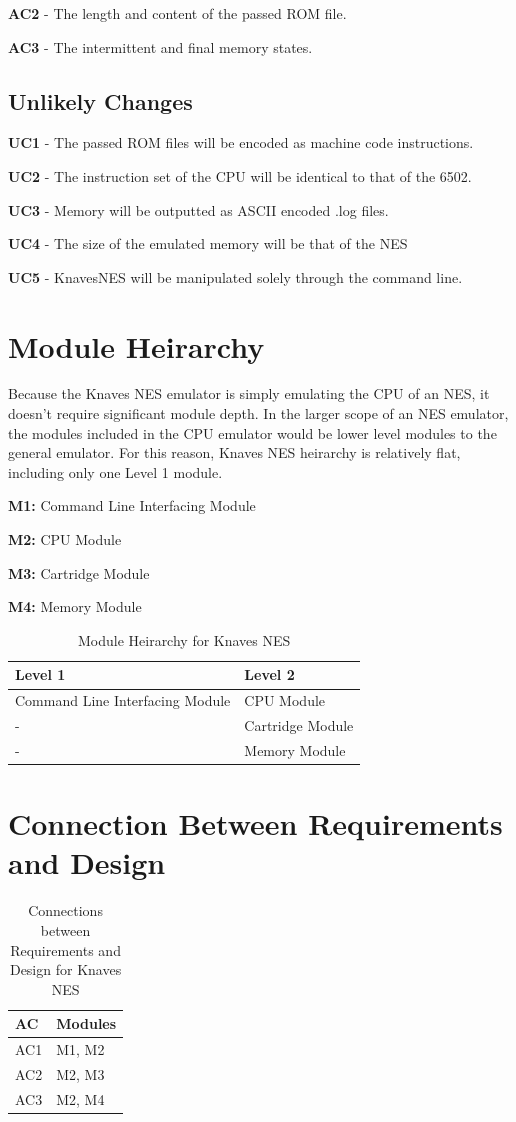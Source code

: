 \documentclass[12pt]{article}
\begin{document}
		\textbf{AC2} - The length and content of the passed ROM file.

		\textbf{AC3} - The intermittent and final memory states.

	\subsection{Unlikely Changes}
		\textbf{UC1} - The passed ROM files will be encoded as machine code instructions.

		\textbf{UC2} - The instruction set of the CPU will be identical to that of the 6502.

		\textbf{UC3} - Memory will be outputted as ASCII encoded .log files.

		\textbf{UC4} - The size of the emulated memory will be that of the NES

		\textbf{UC5} - KnavesNES will be manipulated solely through the command line.

\section{Module Heirarchy}
	Because the Knaves NES emulator is simply emulating the CPU of an NES, it doesn't require significant module depth. In the larger scope of an NES emulator, the modules included in the CPU emulator would be lower level modules to the general emulator. For this reason, Knaves NES heirarchy is relatively flat, including only one Level 1 module.

		\textbf{M1: } Command Line Interfacing Module

		\textbf{M2: } CPU Module

		\textbf{M3: } Cartridge Module

		\textbf{M4: } Memory Module

	\begin{table}[H]
		\centering
		\begin{tabular}{p{2in} p{2in}}
			\hline
			Level 1 & Level 2\\
			\hline
			Command Line Interfacing Module & CPU Module\\
			- & Cartridge Module\\
			- & Memory Module \\
		\end{tabular}
		\caption{Module Heirarchy for Knaves NES}
	\end{table}	

\section{Connection Between Requirements and Design}
	\begin{table}[H]
		\centering
		\begin{tabular}{p{2in} p{2in}}
			\hline
			\textbf{AC} & \textbf{Modules} \\
			\hline
			AC1 & M1, M2 \\
			AC2 & M2, M3 \\
			AC3 & M2, M4 \\
		\end{tabular}
		\caption{Connections between Requirements and Design for Knaves NES}
	\end{table}
\end{document}
